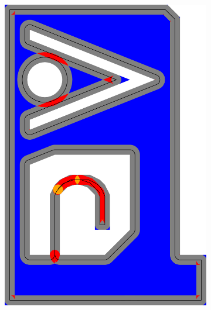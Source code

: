 \begin{figure}
\begin{subfigure}{\figwidth}
\includegraphics[height=\figheight]{sources/validation/gMAT_example/TEST_SingleBead_accuracy.png}

\end{subfigure}
\end{figure}
